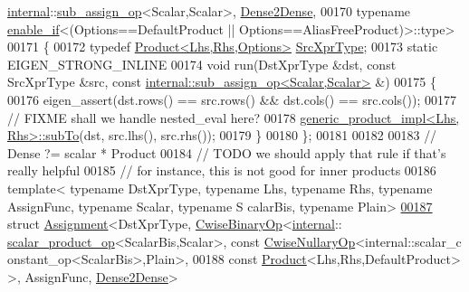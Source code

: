 \begin{DoxyCode}
      \hyperlink{namespaceinternal}{internal}::\hyperlink{struct_eigen_1_1internal_1_1sub__assign__op}{sub\_assign\_op}<Scalar,Scalar>, \hyperlink{struct_eigen_1_1internal_1_1_dense2_dense}{Dense2Dense},
00170   typename \hyperlink{struct_eigen_1_1internal_1_1enable__if}{enable\_if}<(Options==DefaultProduct || Options==AliasFreeProduct)>::type>
00171 \{
00172   \textcolor{keyword}{typedef} \hyperlink{group___core___module_class_eigen_1_1_product}{Product<Lhs,Rhs,Options>} \hyperlink{group___core___module_class_eigen_1_1_product}{SrcXprType};
00173   \textcolor{keyword}{static} EIGEN\_STRONG\_INLINE
00174   \textcolor{keywordtype}{void} run(DstXprType &dst, \textcolor{keyword}{const} SrcXprType &src, \textcolor{keyword}{const} 
      \hyperlink{struct_eigen_1_1internal_1_1sub__assign__op}{internal::sub\_assign\_op<Scalar,Scalar>} &)
00175   \{
00176     eigen\_assert(dst.rows() == src.rows() && dst.cols() == src.cols());
00177     \textcolor{comment}{// FIXME shall we handle nested\_eval here?}
00178     \hyperlink{struct_eigen_1_1internal_1_1generic__product__impl}{generic\_product\_impl<Lhs, Rhs>::subTo}(dst, src.lhs(), src.rhs());
00179   \}
00180 \};
00181 
00182 
00183 \textcolor{comment}{// Dense ?= scalar * Product}
00184 \textcolor{comment}{// TODO we should apply that rule if that's really helpful}
00185 \textcolor{comment}{// for instance, this is not good for inner products}
00186 \textcolor{keyword}{template}< \textcolor{keyword}{typename} DstXprType, \textcolor{keyword}{typename} Lhs, \textcolor{keyword}{typename} Rhs, \textcolor{keyword}{typename} AssignFunc, \textcolor{keyword}{typename} Scalar, \textcolor{keyword}{typename} S
      calarBis, \textcolor{keyword}{typename} Plain>
\hyperlink{struct_eigen_1_1internal_1_1_assignment_3_01_dst_xpr_type_00_01_cwise_binary_op_3_01internal_1_1eb29cc77263dc530639098c389efc225}{00187} \textcolor{keyword}{struct }\hyperlink{struct_eigen_1_1internal_1_1_assignment}{Assignment}<DstXprType, \hyperlink{group___core___module_class_eigen_1_1_cwise_binary_op}{CwiseBinaryOp}<\hyperlink{namespaceinternal}{internal}::
      \hyperlink{struct_eigen_1_1internal_1_1scalar__product__op}{scalar\_product\_op}<ScalarBis,Scalar>, const \hyperlink{group___core___module_class_eigen_1_1_cwise_nullary_op}{CwiseNullaryOp}<internal::scalar\_c
      onstant\_op<ScalarBis>,Plain>,
00188                                            const \hyperlink{group___core___module_class_eigen_1_1_product}{Product}<Lhs,Rhs,DefaultProduct> >, AssignFunc, 
      \hyperlink{struct_eigen_1_1internal_1_1_dense2_dense}{Dense2Dense}>

\end{DoxyCode}
